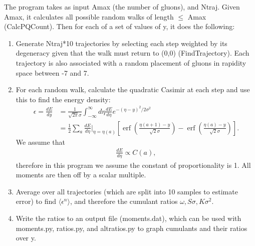\documentclass{article}
\DeclareMathOperator\erf{erf}
\begin{document}
The program takes as input Amax (the number of gluons), and Ntraj. Given Amax, it calculates all possible random walks of length $\leq$ Amax (CalcPQCount). Then for each of a set of values of y, it does the following:
\begin{enumerate}
  \item Generate Ntraj*10 trajectories by selecting each step weighted by its degeneracy given that the walk must return to (0,0) (FindTrajectory). Each trajectory is also associated with a random placement of gluons in rapidity space between -7 and 7.
  \item For each random walk, calculate the quadratic Casimir at each step and use this to find the energy density:
  \begin{align*}
  \epsilon = \frac{dE}{dy} &= \frac{1}{\sqrt{2 \pi} \sigma} \int_{-\infty}^{\infty} d\eta \frac{dE}{d\eta} e^{-(\eta-y)^2/2\sigma^2}  \\ 
  &= \frac{1}{2} \sum_a \frac{dE}{d\eta}\Bigr\rvert_{\eta=\eta(a)} \left[ \erf\left(\frac{\eta(a+1)-y}{\sqrt{2}\sigma}\right) - \erf\left(\frac{\eta(a)-y}{\sqrt{2}\sigma}\right)\right].
  \end{align*}
 We assume that
 \begin{align*}
 \frac{dE}{d\eta} \propto C(a),
 \end{align*}
 therefore in this program we assume the constant of proportionality is 1. All moments are then off by a scalar multiple.
  \item Average over all trajectories (which are split into 10 samples to estimate error) to find $\langle\epsilon^n\rangle$, and therefore the cumulant ratios $\omega, S\sigma, K\sigma^2$.
  \item Write the ratios to an output file (moments.dat), which can be used with moments.py, ratios.py, and altratios.py to graph cumulants and their ratios over y.
\end{enumerate}
\end{document}
